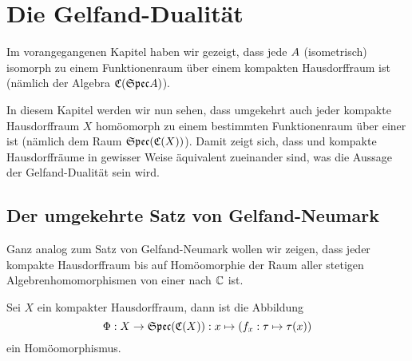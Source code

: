 \section{Die Gelfand-Dualität}\label{sec:GD}

Im vorangegangenen Kapitel haben wir gezeigt, dass jede \CAlg{} $A$ (isometrisch) isomorph zu einem Funktionenraum über einem kompakten Hausdorffraum ist (nämlich der Algebra $\mathfrak{C}(\mathfrak{Spec}A)$). 

In diesem Kapitel werden wir nun sehen, dass umgekehrt auch jeder kompakte Hausdorffraum $X$ homöomorph zu einem bestimmten Funktionenraum über  einer \CAlg{} ist (nämlich dem Raum $\mathfrak{Spec}(\mathfrak{C}(X))$). Damit zeigt sich, dass \CAlgn{} und kompakte Hausdorffräume in gewisser Weise äquivalent zueinander sind, was die Aussage der Gelfand-Dualität sein wird.

\subsection{Der \glqq umgekehrte\grqq{} Satz von Gelfand-Neumark}

Ganz analog zum Satz von Gelfand-Neumark wollen wir zeigen, dass jeder kompakte Hausdorffraum bis auf Homöomorphie der Raum aller stetigen Algebrenhomomorphismen von einer \CAlg{} nach $\mathbb{C}$ ist.

\begin{lemma}\label{lemma:NG}
Sei $X$ ein kompakter Hausdorffraum, dann ist die Abbildung
	\[\Phi: X \to \mathfrak{Spec}(\mathfrak{C}(X)): x \mapsto (f_x: \tau \mapsto \tau(x))\]
ein Homöomorphismus.
\end{lemma}

